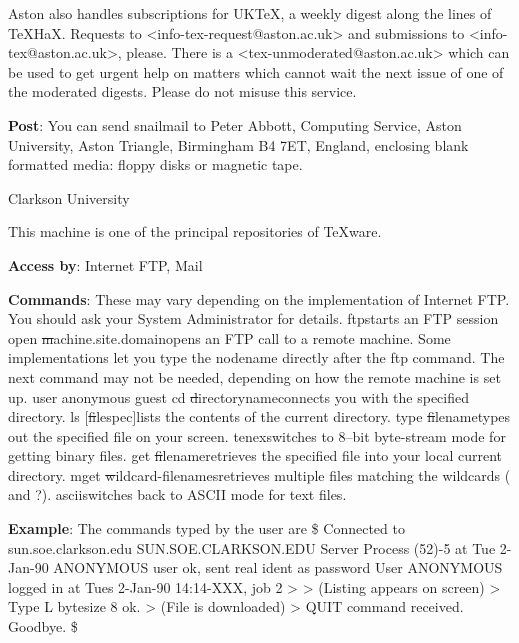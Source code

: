      Aston also handles subscriptions for UK\TeX, a weekly digest along
     the lines of \TeX HaX.
     Requests to <{\tx info-tex-request@aston.ac.uk}> and submissions to
     <{\tx info-tex@aston.ac.uk}>, please.\nl
     There is a <{\tx tex-unmoderated@aston.ac.uk}> which can be used to
     get urgent help on matters which cannot wait the next issue of one
     of the moderated digests. Please do not misuse this service.

{\bf Post}: You can send snailmail to Peter Abbott, Computing Service,
     Aston University, Aston Triangle, Birmingham B4 7ET, England,
     enclosing blank formatted media: floppy disks or magnetic tape.

 {Clarkson University}

     This machine is one of the principal repositories of \TeX ware.

{\bf Access by}: Internet FTP, Mail

{\bf Commands}:  These may vary depending on the implementation of
     Internet FTP. You should ask your System Administrator for
     details.\nl
{\tx ftp}\quad starts an FTP session\nl
{\tx open} {\st machine.site.domain}\quad opens an FTP call to a
     remote machine. Some implementations let you type the nodename
     directly after the {\tx ftp} command. The next command may not be
     needed, depending on how the remote machine is set up.\nl
{\tx user anonymous guest}\nl
{\tx cd} {\st directoryname}\quad connects you with the specified
     directory.\nl
{\tx ls} $[${\st filespec}$]$\quad lists the contents of the current
     directory.\nl
{\tx type} {\st filename}\quad types out the specified file on your
     screen.\nl
{\tx tenex}\quad switches to 8--bit byte-stream mode for getting binary
     files.\nl
{\tx get} {\st filename}\quad retrieves the specified file into your
     local current directory.\nl
{\tx mget} {\st wildcard-filenames}\quad retrieves multiple files
     matching the wildcards ({\tx *} and {\tx ?}).\nl
{\tx ascii}\quad switches back to ASCII mode for text files.

{\bf Example}: The commands typed by the user are \nl
{\tx \$} \nl
{\tx Connected to sun.soe.clarkson.edu}\nl
{ SUN.SOE.CLARKSON.EDU Server Process (52)-5 at Tue 2-Jan-90}\nl
{ ANONYMOUS user ok, sent real ident as password}\nl
{ User ANONYMOUS logged in at Tues 2-Jan-90 14:14-XXX, job 2}\nl
{\tx >} \nl
{\tx >} \nl
     (Listing appears on screen)\nl
{\tx >} \nl
{ Type L bytesize 8 ok.}\nl
{\tx >} \nl
     (File is downloaded)\nl
{\tx >} \nl
{ QUIT command received. Goodbye.}\nl
{\tx \$}

